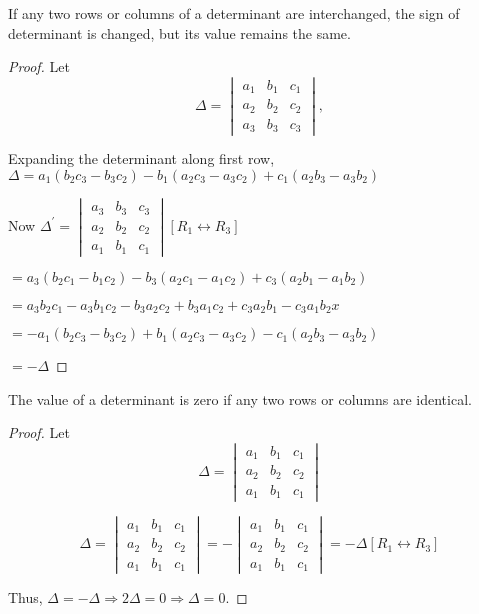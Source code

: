 \begin{theorem}
  If any two rows or columns of a determinant are interchanged, the sign of determinant is changed, but its value remains the same.
\end{theorem}

\begin{proof}
  Let $$\Delta = \begin{vmatrix}a_1 & b_1 & c_1\\a_2 & b_2 & c_2\\ a_3 & b_3 &c_3\end{vmatrix},$$

Expanding the determinant along first row, $\Delta = a_1(b_2c_3 - b_3c_2) - b_1(a_2c_3 - a_3c_2) + c_1(a_2b_3 - a_3b_2)$

Now $\Delta^{\prime} = \begin{vmatrix}a_3 & b_3 & c_3\\a_2 & b_2 & c_2\\a_1 & b_1 & c_1\end{vmatrix} [R_1 \leftrightarrow R_3]$

$= a_3(b_2c_1 - b_1c_2) - b_3(a_2c_1 - a_1c_2) + c_3(a_2b_1 - a_1b_2)$

$= a_3b_2c_1 - a_3b_1c_2 - b_3a_2c_2 + b_3a_1c_2 + c_3a_2b_1 - c_3a_1b_2x$

$= -a_1(b_2c_3 - b_3c_2) + b_1(a_2c_3 - a_3c_2) - c_1(a_2b_3 - a_3b_2)$

$= -\Delta$
\end{proof}


\begin{theorem}
  The value of a determinant is zero if any two rows or columns are identical.
\end{theorem}

\begin{proof}
  Let $$\Delta = \begin{vmatrix}a_1 & b_1 & c_1\\a_2 & b_2 & c_2\\ a_1 & b_1 & c_1\end{vmatrix}$$

$$\Delta = \begin{vmatrix}a_1 & b_1 & c_1\\a_2 & b_2 & c_2 \\ a_1 &
b_1 & c_1\end{vmatrix} = - \begin{vmatrix}a_1 & b_1 & c_1\\a_2 & b_2 & c_2 \\
a_1 & b_1 & c_1\end{vmatrix} = -\Delta [R_1\leftrightarrow R_3]$$

Thus, $\Delta = -\Delta \Rightarrow 2\Delta = 0 \Rightarrow \Delta = 0$.
\end{proof}

